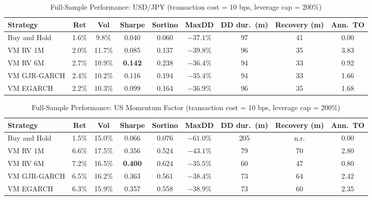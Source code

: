 \documentclass[12pt, a4paper]{article}
\begin{document}
\begin{table}[H]
  \centering
  \caption{Full-Sample Performance: USD/JPY (transaction cost = 10 bps, leverage cap = 200\%)}
  \label{tab:perf_fx}
  \footnotesize
  \begin{tabular}{lcccccccc}
    \toprule
    \textbf{Strategy} & \textbf{Ret} & \textbf{Vol} & \textbf{Sharpe} & \textbf{Sortino}
                      & \textbf{MaxDD} & \textbf{DD dur.\ (m)} & \textbf{Recovery (m)}
                      & \textbf{Ann.\ TO} \\
    \midrule
    Buy and Hold      & 1.6\% &  9.8\% & 0.040          & 0.060 & $-37.1$\% & 97 & 41 & 0.00 \\
    VM RV 1M          & 2.0\% & 11.7\% & 0.085          & 0.137 & $-39.8$\% & 96 & 35 & 3.83 \\
    VM RV 6M          & 2.7\% & 10.9\% & \textbf{0.142} & 0.238 & $-36.4$\% & 94 & 33 & 0.92 \\
    VM GJR-GARCH      & 2.4\% & 10.2\% & 0.116          & 0.194 & $-35.4$\% & 94 & 33 & 1.66 \\
    VM EGARCH         & 2.2\% & 10.3\% & 0.099          & 0.164 & $-36.9$\% & 96 & 35 & 1.68 \\
    \bottomrule
  \end{tabular}
\end{table}

\begin{table}[H]
  \centering
  \caption{Full-Sample Performance: US Momentum Factor (transaction cost = 10 bps, leverage cap = 200\%)}
  \label{tab:perf_mom}
  \footnotesize
  \begin{tabular}{lcccccccc}
    \toprule
    \textbf{Strategy} & \textbf{Ret} & \textbf{Vol} & \textbf{Sharpe} & \textbf{Sortino}
                      & \textbf{MaxDD} & \textbf{DD dur.\ (m)} & \textbf{Recovery (m)}
                      & \textbf{Ann.\ TO} \\
    \midrule
    Buy and Hold      & 1.5\% & 15.0\% & 0.066          & 0.076 & $-61.0$\% & 205 & n.r. & 0.00 \\
    VM RV 1M          & 6.6\% & 17.5\% & 0.356          & 0.524 & $-43.1$\% &  79 & 70 & 2.80 \\
    VM RV 6M          & 7.2\% & 16.5\% & \textbf{0.400} & 0.624 & $-35.5$\% &  60 & 47 & 0.80 \\
    VM GJR-GARCH      & 6.5\% & 16.2\% & 0.363          & 0.561 & $-38.4$\% &  73 & 64 & 2.42 \\
    VM EGARCH         & 6.3\% & 15.9\% & 0.357          & 0.558 & $-38.9$\% &  73 & 60 & 2.35 \\
    \bottomrule
  \end{tabular}
\end{table}
\end{document}
